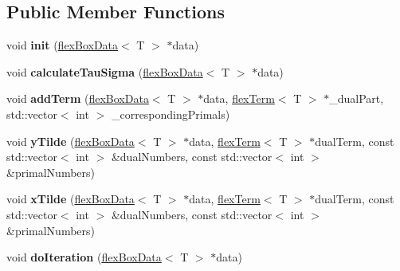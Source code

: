 \subsection*{Public Member Functions}
\begin{DoxyCompactItemize}
\item 
\mbox{\label{classflex_solver_primal_dual_cuda_a41d4d35abe71c6d2fdd79d460f6f8306}} 
void {\bfseries init} (\hyperlink{classflex_box_data}{flex\+Box\+Data}$<$ T $>$ $\ast$data)
\item 
\mbox{\label{classflex_solver_primal_dual_cuda_a80d051306bf6354cad9654181e5080b9}} 
void {\bfseries calculate\+Tau\+Sigma} (\hyperlink{classflex_box_data}{flex\+Box\+Data}$<$ T $>$ $\ast$data)
\item 
\mbox{\label{classflex_solver_primal_dual_cuda_aa7e9fe5b975a1a5e3a74440da7a0245a}} 
void {\bfseries add\+Term} (\hyperlink{classflex_box_data}{flex\+Box\+Data}$<$ T $>$ $\ast$data, \hyperlink{classflex_term}{flex\+Term}$<$ T $>$ $\ast$\+\_\+dual\+Part, std\+::vector$<$ int $>$ \+\_\+corresponding\+Primals)
\item 
\mbox{\label{classflex_solver_primal_dual_cuda_a0e866f64654ee21f7105a3e38447621c}} 
void {\bfseries y\+Tilde} (\hyperlink{classflex_box_data}{flex\+Box\+Data}$<$ T $>$ $\ast$data, \hyperlink{classflex_term}{flex\+Term}$<$ T $>$ $\ast$dual\+Term, const std\+::vector$<$ int $>$ \&dual\+Numbers, const std\+::vector$<$ int $>$ \&primal\+Numbers)
\item 
\mbox{\label{classflex_solver_primal_dual_cuda_ad254501e2e09f300df111c502b4f40aa}} 
void {\bfseries x\+Tilde} (\hyperlink{classflex_box_data}{flex\+Box\+Data}$<$ T $>$ $\ast$data, \hyperlink{classflex_term}{flex\+Term}$<$ T $>$ $\ast$dual\+Term, const std\+::vector$<$ int $>$ \&dual\+Numbers, const std\+::vector$<$ int $>$ \&primal\+Numbers)
\item 
\mbox{\label{classflex_solver_primal_dual_cuda_a4790bcbc1a7711002ffb9c6c6b29c05f}} 
void {\bfseries do\+Iteration} (\hyperlink{classflex_box_data}{flex\+Box\+Data}$<$ T $>$ $\ast$data)
\item 

\end{DoxyCompactItemize}
